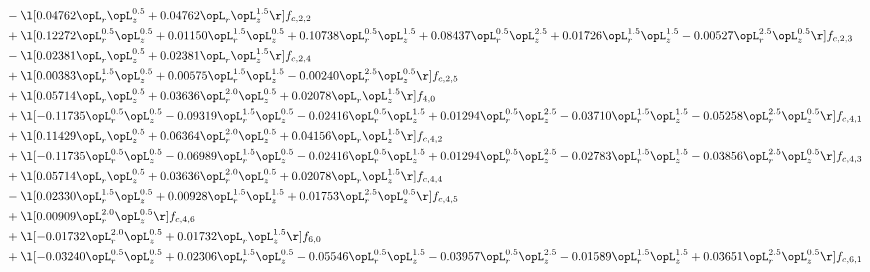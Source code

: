 \begin{alignat}{2}
& - \l[  0.04762 \opL_r \opL_z^{0.5} +  0.04762 \opL_r \opL_z^{1.5}  \r] f_{c,2,2} \nonumber \\ 
& + \l[  0.12272 \opL_r^{0.5} \opL_z^{0.5} +  0.01150 \opL_r^{1.5} \opL_z^{0.5} +  0.10738 \opL_r^{0.5} \opL_z^{1.5} +  0.08437 \opL_r^{0.5} \opL_z^{2.5} +  0.01726 \opL_r^{1.5} \opL_z^{1.5}   -0.00527 \opL_r^{2.5} \opL_z^{0.5}  \r] f_{c,2,3} \nonumber \\ 
& - \l[  0.02381 \opL_r \opL_z^{0.5} +  0.02381 \opL_r \opL_z^{1.5}  \r] f_{c,2,4} \nonumber \\ 
& + \l[  0.00383 \opL_r^{1.5} \opL_z^{0.5} +  0.00575 \opL_r^{1.5} \opL_z^{1.5}   -0.00240 \opL_r^{2.5} \opL_z^{0.5}  \r] f_{c,2,5} \nonumber \\ 
& + \l[  0.05714 \opL_r \opL_z^{0.5} +  0.03636 \opL_r^{2.0} \opL_z^{0.5} +  0.02078 \opL_r \opL_z^{1.5}  \r] f_{4,0} \nonumber \\ 
& + \l[  -0.11735 \opL_r^{0.5} \opL_z^{0.5}   -0.09319 \opL_r^{1.5} \opL_z^{0.5}   -0.02416 \opL_r^{0.5} \opL_z^{1.5} +  0.01294 \opL_r^{0.5} \opL_z^{2.5}   -0.03710 \opL_r^{1.5} \opL_z^{1.5}   -0.05258 \opL_r^{2.5} \opL_z^{0.5}  \r] f_{c,4,1} \nonumber \\ 
& + \l[  0.11429 \opL_r \opL_z^{0.5} +  0.06364 \opL_r^{2.0} \opL_z^{0.5} +  0.04156 \opL_r \opL_z^{1.5}  \r] f_{c,4,2} \nonumber \\ 
& + \l[  -0.11735 \opL_r^{0.5} \opL_z^{0.5}   -0.06989 \opL_r^{1.5} \opL_z^{0.5}   -0.02416 \opL_r^{0.5} \opL_z^{1.5} +  0.01294 \opL_r^{0.5} \opL_z^{2.5}   -0.02783 \opL_r^{1.5} \opL_z^{1.5}   -0.03856 \opL_r^{2.5} \opL_z^{0.5}  \r] f_{c,4,3} \nonumber \\ 
& + \l[  0.05714 \opL_r \opL_z^{0.5} +  0.03636 \opL_r^{2.0} \opL_z^{0.5} +  0.02078 \opL_r \opL_z^{1.5}  \r] f_{c,4,4} \nonumber \\ 
& - \l[  0.02330 \opL_r^{1.5} \opL_z^{0.5} +  0.00928 \opL_r^{1.5} \opL_z^{1.5} +  0.01753 \opL_r^{2.5} \opL_z^{0.5}  \r] f_{c,4,5} \nonumber \\ 
& + \l[  0.00909 \opL_r^{2.0} \opL_z^{0.5}  \r] f_{c,4,6} \nonumber \\ 
& + \l[  -0.01732 \opL_r^{2.0} \opL_z^{0.5} +  0.01732 \opL_r \opL_z^{1.5}  \r] f_{6,0} \nonumber \\ 
& + \l[  -0.03240 \opL_r^{0.5} \opL_z^{0.5} +  0.02306 \opL_r^{1.5} \opL_z^{0.5}   -0.05546 \opL_r^{0.5} \opL_z^{1.5}   -0.03957 \opL_r^{0.5} \opL_z^{2.5}   -0.01589 \opL_r^{1.5} \opL_z^{1.5} +  0.03651 \opL_r^{2.5} \opL_z^{0.5}  \r] f_{c,6,1} \nonumber \\ 

\end{alignat}
